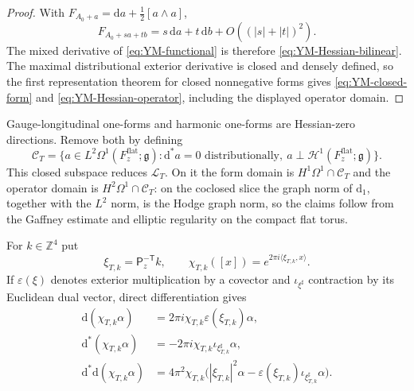 \documentclass[11pt]{article}
\numberwithin{equation}{section}
\theoremstyle{definition}
\theoremstyle{remark}
\newcommand{\Z}{\mathbb Z}
\newcommand{\dd}{\mathrm d}
\begin{document}
\begin{proof}
With $F_{A_0+a}=\dd a+\tfrac12[a\wedge a]$,
\[
 F_{A_0+sa+tb}=s\,\dd a+t\,\dd b+O((|s|+|t|)^2).
\]
The mixed derivative of \eqref{eq:YM-functional} is therefore
\eqref{eq:YM-Hessian-bilinear}.  The maximal distributional exterior
derivative is closed and densely defined, so the first representation theorem
for closed nonnegative forms gives \eqref{eq:YM-closed-form} and
\eqref{eq:YM-Hessian-operator}, including the displayed operator domain.
\end{proof}

Gauge-longitudinal one-forms and harmonic one-forms are Hessian-zero
directions.  Remove both by defining
\begin{equation}\label{eq:continuum-Coulomb-space}
 \mathscr C_T=\{a\in L^2\Omega^1(F_z^{\mathrm{flat}};\mathfrak g):
 \dd^*a=0\text{ distributionally},\ 
 a\perp\mathcal H^1(F_z^{\mathrm{flat}};\mathfrak g)\}.
\end{equation}
This closed subspace reduces $\mathcal L_T$.  On it the form domain is
$H^1\Omega^1\cap\mathscr C_T$ and the operator domain is
$H^2\Omega^1\cap\mathscr C_T$: on the coclosed slice the graph norm of
$\dd_1$, together with the $L^2$ norm, is the Hodge graph norm, so the
claims follow from the Gaffney estimate and elliptic regularity on the compact
flat torus.

For $k\in\Z^4$ put
\[
 \xi_{T,k}=\mathsf P_z^{-\mathsf T}k,
 \qquad
 \chi_{T,k}([x])=e^{2\pi i\langle\xi_{T,k},x\rangle}.
\]
If $\varepsilon(\xi)$ denotes exterior multiplication by a covector and
$\iota_{\xi^\sharp}$ contraction by its Euclidean dual vector, direct
differentiation gives
\begin{align}
 \dd(\chi_{T,k}\alpha)
 &=2\pi i\chi_{T,k}\varepsilon(\xi_{T,k})\alpha,
 \label{eq:continuum-d-symbol}\\
 \dd^*(\chi_{T,k}\alpha)
 &=-2\pi i\chi_{T,k}\iota_{\xi_{T,k}^\sharp}\alpha,
 \label{eq:continuum-dstar-symbol}\\
 \dd^*\dd(\chi_{T,k}\alpha)
 &=4\pi^2\chi_{T,k}
 \bigl(|\xi_{T,k}|^2\alpha-
 \varepsilon(\xi_{T,k})\iota_{\xi_{T,k}^\sharp}\alpha\bigr).
 \label{eq:continuum-Hessian-symbol}
\end{align}
\end{document}
